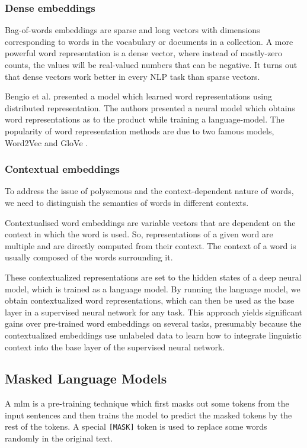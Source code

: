 \subsubsection{Dense embeddings}\label{subsubsec:static-embeddings}
Bag-of-words embeddings are sparse and long vectors with dimensions corresponding to words in the vocabulary or documents in a collection.
A more powerful word representation is a dense vector, where instead of mostly-zero counts, the values will be real-valued numbers that can be negative.
It turns out that dense vectors work better in every NLP task than sparse vectors.

Bengio et al. \cite{conf/nips/BengioDV00} presented a model which learned word representations using distributed
representation. The authors presented a neural model which obtains word representations as to
the product while training a \gls{language-model}.
The popularity of word representation methods are due to two famous models, Word2Vec
\cite{mikolov2013efficient} and GloVe \cite{pennington2014glove}.

\subsubsection{Contextual embeddings}\label{subsubsec:contextual-embeddings}
To address the issue of polysemous and the context-dependent nature of words, we need to
distinguish the semantics of words in different contexts.

Contextualised word embeddings are variable vectors that are dependent on the context in which the word is used.
So, representations of a given word are multiple and are
directly computed from their context. The context of a
word is usually composed of the words surrounding it.

These contextualized representations are set to the hidden states of a deep neural model, which is trained as a language model.
By running the language model, we obtain contextualized word representations, which can then be used as the base layer in a supervised neural network for any task. This approach yields significant gains over pre-trained word embeddings on several tasks, presumably because the contextualized embeddings use unlabeled data to learn how to integrate linguistic context into the base layer of the supervised neural network.



\subsection{Masked Language Models}\label{subsec:masked-language-models}
A \acrfull{mlm} is a pre-training technique which first masks out some tokens from the
input sentences and then trains the model to predict the masked
tokens by the rest of the tokens. A special \texttt{[MASK]} token is used to replace some words randomly in the original text.


